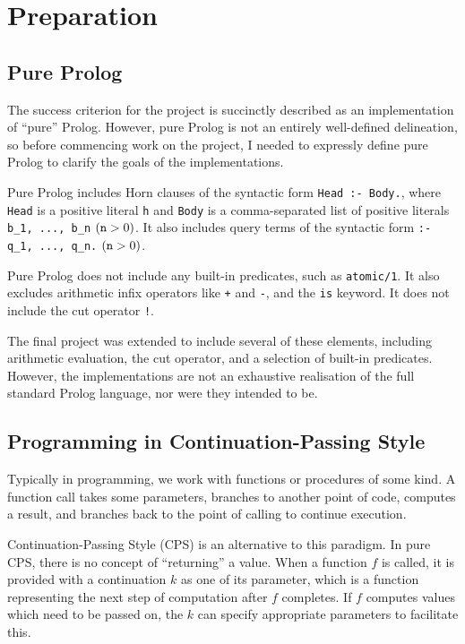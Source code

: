 \documentclass[12pt]{article}
\begin{document}
\newpage

\section{Preparation}


\subsection{Pure Prolog}

The success criterion for the project is succinctly described as an implementation of ``pure'' Prolog. 
However, pure Prolog is not an entirely well-defined delineation, so before commencing work on the project, I needed to expressly define pure Prolog to clarify the goals of the implementations.

Pure Prolog includes Horn clauses of the syntactic form \verb|Head :- Body.|, where \verb|Head| is a positive literal \verb|h| and \verb|Body| is a comma-separated list of positive literals \verb|b_1, ..., b_n| $(\verb|n| > 0)$. 
It also includes query terms of the syntactic form \verb|:- q_1, ..., q_n.| $(\verb|n| > 0)$.

Pure Prolog does not include any built-in predicates, such as \verb|atomic/1|. 
It also excludes arithmetic infix operators like \verb|+| and \verb|-|, and the \verb|is| keyword. 
It does not include the cut operator \verb|!|.

The final project was extended to include several of these elements, including arithmetic evaluation, the cut operator, and a selection of built-in predicates.
However, the implementations are not an exhaustive realisation of the full standard Prolog language, nor were they intended to be.

\subsection{Programming in Continuation-Passing Style}

Typically in programming, we work with functions or procedures of some kind. 
A function call takes some parameters, branches to another point of code, computes a result, and branches back to the point of calling to continue execution.

Continuation-Passing Style (CPS) is an alternative to this paradigm. 
In pure CPS, there is no concept of ``returning'' a value. 
When a function $f$ is called, it is provided with a continuation $k$ as one of its parameter, which is a function representing the next step of computation after $f$ completes. 
If $f$ computes values which need to be passed on, the $k$ can specify appropriate parameters to facilitate this.
\end{document}
